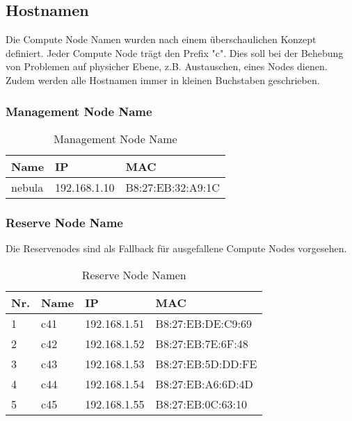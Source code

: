 \subsection{Hostnamen}
Die Compute Node Namen wurden nach einem überschaulichen Konzept definiert. Jeder Compute Node trägt den Prefix "c". Dies soll bei der Behebung von Problemen auf physicher Ebene, z.B. Austauschen, eines Nodes dienen. Zudem werden alle Hostnamen immer in kleinen Buchstaben geschrieben. 

\subsubsection{Management Node Name}
\begin{table}[H]
\centering
\begin{tabular}{p{5cm}p{5.5cm}p{5.5cm}}
\hline
\rowcolor{heading} \textbf{Name} & \textbf{IP} & \textbf{MAC} \\\hline
nebula & 192.168.1.10 & B8:27:EB:32:A9:1C \\\hline
\end{tabular}
\caption{Management Node Name}
\end{table}

\subsubsection{Reserve Node Name}
Die Reservenodes sind als Fallback für ausgefallene Compute Nodes vorgesehen.
\begin{table}[H]
\centering
\begin{tabular}{p{1cm}p{2cm}p{6cm}p{6cm}}
\hline
\rowcolor{heading} \textbf{Nr.} & \textbf{Name} & \textbf{IP} & \textbf{MAC} \\\hline
1 & c41 & 192.168.1.51 & B8:27:EB:DE:C9:69 \\\hline
2 & c42 & 192.168.1.52 & B8:27:EB:7E:6F:48 \\\hline
3 & c43 & 192.168.1.53 & B8:27:EB:5D:DD:FE \\\hline
4 & c44 & 192.168.1.54 & B8:27:EB:A6:6D:4D \\\hline
5 & c45 & 192.168.1.55 & B8:27:EB:0C:63:10 \\\hline
\end{tabular}
\caption{Reserve Node Namen}
\end{table}

